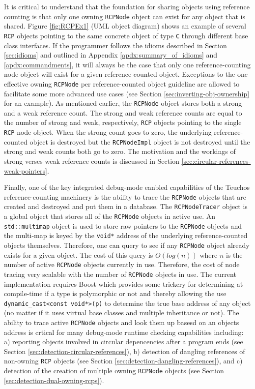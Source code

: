 \documentclass[pdf,ps2pdf,11pt]{SANDreport}
\begin{document}
It is critical to understand that the foundation for sharing objects
using reference counting is that only one owning {}\texttt{RCPNode}
object can exist for any object that is shared.  Figure
{}\ref{fig:RCPEx1} (UML object diagram) shows an example of several
{}\texttt{RCP} objects pointing to the same concrete object of type
{}\texttt{C} through different base class interfaces.  If the
programmer follows the idioms described in Section {}\ref{sec:idioms}
and outlined in Appendix {}\ref{apdx:summary_of_idioms} and
{}\ref{apdx:commandments}, it will always be the case that only one
reference-counting node object will exist for a given
reference-counted object.  Exceptions to the one effective owning
{}\texttt{RCPNode} per reference-counted object guideline are allowed
to facilitate some more advanced use cases (see Section
{}\ref{sec:inverting-obj-ownership} for an example).  As mentioned
earlier, the {}\texttt{RCPNode} object stores both a strong and a weak
reference count.  The strong and weak reference counts are equal to
the number of strong and weak, respectively, {}\texttt{RCP} objects
pointing to the single {}\texttt{RCP} node object.  When the strong
count goes to zero, the underlying reference-counted object is
destroyed but the {}\texttt{RCPNodeImpl} object is not destroyed until
the strong and weak counts both go to zero.  The motivation and the
workings of strong verses weak reference counts is discussed in
Section {}\ref{sec:circular-references-weak-pointers}.

Finally, one of the key integrated debug-mode eanbled capabilities of
the Teuchos reference-counting machinery is the ability to trace the
{}\texttt{RCPNode} objects that are created and destroyed and put them
in a database.  The {}\texttt{RCPNodeTracer} object is a global object
that stores all of the {}\texttt{RCPNode} objects in active use.  An
{}\texttt{std::multimap} object is used to store raw pointers to the
{}\texttt{RCPNode} objects and the multi-map is keyed by the
{}\texttt{void*} address of the underlying reference-counted objects
themselves.  Therefore, one can query to see if any {}\texttt{RCPNode}
object already exists for a given object.  The cost of this query is
$O(log(n))$ where $n$ is the number of active {}\texttt{RCPNode}
objects currently in use.  Therefore, the cost of node tracing very
scalable with the number of {}\texttt{RCPNode} objects in use.  The
current implementation requires Boost which provides some trickery for
determining at compile-time if a type is polymorphic or not and
thereby allowing the use {}\texttt{dynamic\_cast<const void*>(p)} to
determine the true base address of any object (no matter if it uses
virtual base classes and multiple inheritance or not).  The ability to
trace active {}\texttt{RCPNode} objects and look them up basesd on an
objects address is crtical for many debug-mode runtime checking
capabilities including: a) reporting objects involved in circular
depencencies after a program ends (see Section
{}\ref{sec:detection-circular-references}), b) detection of dangling
references of non-owning {}\texttt{RCP} objects (see Section
{}\ref{sec:detection-dangling-references}), and c) detection of the
creation of multiple owning {}\texttt{RCPNode} objects (see Section
{}\ref{sec:detection-dual-owning-rcps}).
\end{document}
